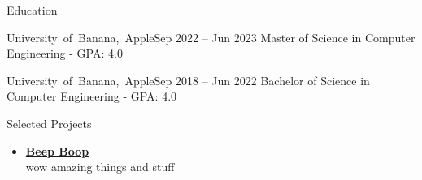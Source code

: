 \documentclass[]{../mcdowellcv}
\begin{document}
\makeheader

\begin{cvsection}{Education}

    \begin{cvsubsection}{\mbox {University of Banana, Apple}}{}{Sep 2022 -- Jun 2023}
        Master of Science in Computer Engineering - GPA: 4.0
    \end{cvsubsection}
    
    \begin{cvsubsection}{\mbox {University of Banana, Apple}}{}{Sep 2018 -- Jun 2022}
        Bachelor of Science in Computer Engineering - GPA: 4.0
    \end{cvsubsection}
    
\end{cvsection}


\begin{cvsection}{Selected Projects}

        \begin{cvsubsection}{}{}{}
            \begin{itemize}
                \setlength\itemsep{3pt}
                \item\textbf{\href{https://github.com/johndoe/beepboop}{Beep Boop}} \\
                wow amazing things and stuff
            \end{itemize}
        \end{cvsubsection}
    
\end{cvsection}
\end{document}
